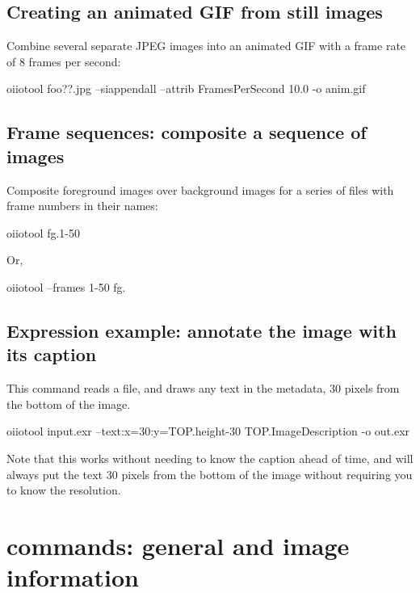 \subsection*{Creating an animated GIF from still images}
 

\noindent Combine several separate JPEG images into an animated GIF with
a frame rate of 8 frames per second:

\begin{code}
    oiiotool foo??.jpg --siappendall --attrib FramesPerSecond 10.0 -o anim.gif
\end{code}


\subsection*{Frame sequences: composite a sequence of images}

\noindent Composite foreground images over background images for a
series of files with frame numbers in their names:
\begin{code}
    oiiotool fg.1-50%
\end{code}

\noindent Or,
\begin{code}
    oiiotool --frames 1-50 fg.%
\end{code}


\subsection*{Expression example: annotate the image with its caption}

\noindent This command reads a file, and draws any text in the
 metadata, 30 pixels from the bottom of the image.
\begin{code}
    oiiotool input.exr --text:x=30:y={TOP.height-30} {TOP.ImageDescription} -o out.exr
\end{code}
\noindent Note that this works without needing to know the caption ahead
of time, and will always put the text 30 pixels from the bottom of the image
without requiring you to know the resolution.


\newpage
\section{\oiiotool commands: general and image information}

